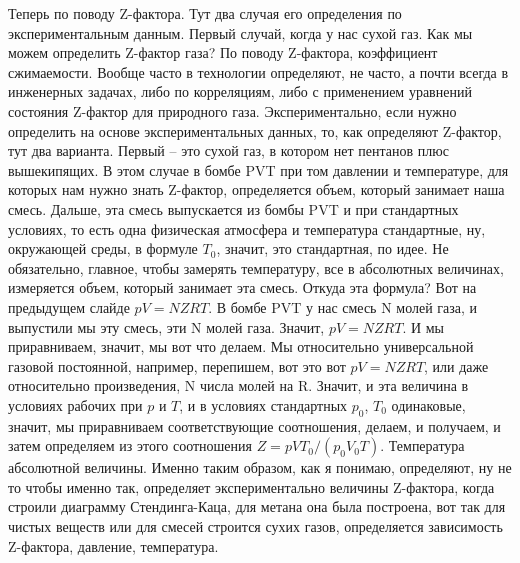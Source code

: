 \documentclass[main.tex]{subfiles}
\begin{document}
Теперь по поводу Z-фактора.
Тут два случая его определения по экспериментальным данным.
Первый случай, когда у нас сухой газ.
Как мы можем определить Z-фактор газа?
По поводу Z-фактора, коэффициент сжимаемости.
Вообще часто в технологии определяют, не часто, а почти всегда в инженерных задачах, либо по корреляциям, либо с применением уравнений состояния Z-фактор для природного газа.
Экспериментально, если нужно определить на основе экспериментальных данных, то, как определяют Z-фактор, тут два варианта.
Первый -- это сухой газ, в котором нет пентанов плюс вышекипящих.
В этом случае в бомбе PVT при том давлении и температуре, для которых нам нужно знать Z-фактор, определяется объем, который занимает наша смесь.
Дальше, эта смесь выпускается из бомбы PVT и при стандартных условиях, то есть одна физическая атмосфера и температура стандартные, ну, окружающей среды, в формуле $T_0$, значит, это стандартная, по идее.
Не обязательно, главное, чтобы замерять температуру, все в абсолютных величинах, измеряется объем, который занимает эта смесь.
Откуда эта формула?
Вот на предыдущем слайде $pV=NZRT$.
В бомбе PVT у нас смесь N молей газа, и выпустили мы эту смесь, эти N молей газа.
Значит, $pV=NZRT$.
И мы приравниваем, значит, мы вот что делаем.
Мы относительно универсальной газовой постоянной, например, перепишем, вот это вот $pV=NZRT$, или даже относительно произведения, N числа молей на R.
Значит, и эта величина в условиях рабочих при $p$ и $T$, и в условиях стандартных $p_0$, $T_0$ одинаковые, значит, мы приравниваем соответствующие соотношения, делаем, и получаем, и затем определяем из этого соотношения $Z=pVT_0/(p_0V_0T)$.
Температура абсолютной величины.
Именно таким образом, как я понимаю, определяют, ну не то чтобы именно так, определяет экспериментально величины Z-фактора, когда строили диаграмму Стендинга-Каца, для метана она была построена, вот так для чистых веществ или для смесей строится сухих газов, определяется зависимость Z-фактора, давление, температура.
\end{document}
